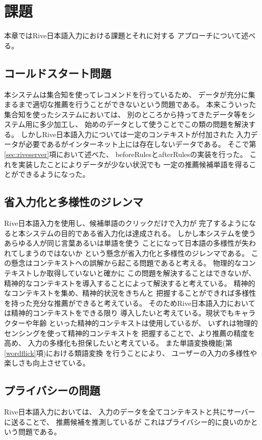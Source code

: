 \chapter{課題}
\label{chap:discussion}
本章ではRive日本語入力における課題とそれに対する
アプローチについて述べる。

\newpage
\section{コールドスタート問題}
本システムは集合知を使ってレコメンドを行っているため、
データが充分に集まるまで適切な推薦を行うことができないという問題である。
本来こういった集合知を使ったシステムにおいては、
別のところから持ってきたデータ等をシステム用に多少加工し、
始めのデータとして使うことでこの類の問題を解決する。
しかしRive日本語入力については一定のコンテキストが付加された
入力データが必要であるがインターネット上には存在しないデータである。
そこで第\ref{sec:riveserver}項において述べた、
beforeRulesとafterRulesの実装を行った。
これを実装したことによりデータが少ない状況でも
一定の推薦候補単語を得ることができるようになった。

\section{省入力化と多様性のジレンマ}
Rive日本語入力を使用し、候補単語のクリックだけで入力が
完了するようになると本システムの目的である省入力化は達成される。
しかし本システムを使うあらゆる人が同じ言葉あるいは単語を使う
ことになって日本語の多様性が失われてしまうのではないか
という懸念が省入力化と多様性のジレンマである。
この懸念はコンテキストへの誤解から起こる問題であると考える。
物理的なコンテキストしか取得していないと確かに
この問題を解決することはできないが、
精神的なコンテキストを導入することによって解決すると考えている。
精神的なコンテキストを集め、精神的状況をきちんと
把握することができれば多様性を持った充分な推薦ができると考えている。
そのためRive日本語入力においては精神的コンテキストをできる限り
導入したいと考えている。現状でもキャラクターや年齢
といった精神的コンテキストは使用しているが、
いずれは物理的センシングを使って精神的コンテキストを
把握することで、より推薦の精度を高め、
入力の多様化も担保したいと考えている。
また単語変換機能(第\ref{wordflick}項)における類語変換
を行うことにより、
ユーザーの入力の多様性や楽しさも向上させている。

\section{プライバシーの問題}
Rive日本語入力においては、
入力のデータを全てコンテキストと共にサーバーに送ることで、
推薦候補を推測しているが
これはプライバシー的に良いのかという問題である。


